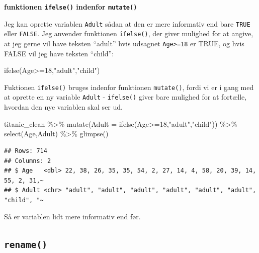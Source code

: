 \documentclass[
]{book}
\newenvironment{Shaded}{\begin{snugshade}}{\end{snugshade}}
\newcommand{\AttributeTok}[1]{\textcolor[rgb]{0.77,0.63,0.00}{#1}}
\newcommand{\DecValTok}[1]{\textcolor[rgb]{0.00,0.00,0.81}{#1}}
\newcommand{\FunctionTok}[1]{\textcolor[rgb]{0.00,0.00,0.00}{#1}}
\newcommand{\NormalTok}[1]{#1}
\newcommand{\SpecialCharTok}[1]{\textcolor[rgb]{0.00,0.00,0.00}{#1}}
\newcommand{\StringTok}[1]{\textcolor[rgb]{0.31,0.60,0.02}{#1}}
\begin{document}
\textbf{funktionen \texttt{ifelse()} indenfor \texttt{mutate()}}

Jeg kan oprette variablen \texttt{Adult} sådan at den er mere informativ end bare \texttt{TRUE} eller \texttt{FALSE}. Jeg anvender funktionen \texttt{ifelse()}, der giver mulighed for at angive, at jeg gerne vil have teksten ``adult'' hvis udsagnet \texttt{Age\textgreater{}=18} er TRUE, og hvis FALSE vil jeg have teksten ``child'':

\begin{Shaded}
\begin{Highlighting}[]
\FunctionTok{ifelse}\NormalTok{(Age}\SpecialCharTok{\textgreater{}=}\DecValTok{18}\NormalTok{,}\StringTok{"adult"}\NormalTok{,}\StringTok{"child"}\NormalTok{)}
\end{Highlighting}
\end{Shaded}

Fuktionen \texttt{ifelse()} bruges indenfor funktionen \texttt{mutate()}, fordi vi er i gang med at oprette en ny variable \texttt{Adult} - \texttt{ifelse()} giver bare mulighed for at fortælle, hvordan den nye variablen skal ser ud.

\begin{Shaded}
\begin{Highlighting}[]
\NormalTok{titanic\_clean }\SpecialCharTok{\%\textgreater{}\%} 
    \FunctionTok{mutate}\NormalTok{(}\AttributeTok{Adult =} \FunctionTok{ifelse}\NormalTok{(Age}\SpecialCharTok{\textgreater{}=}\DecValTok{18}\NormalTok{,}\StringTok{"adult"}\NormalTok{,}\StringTok{"child"}\NormalTok{)) }\SpecialCharTok{\%\textgreater{}\%}
    \FunctionTok{select}\NormalTok{(Age,Adult) }\SpecialCharTok{\%\textgreater{}\%}
    \FunctionTok{glimpse}\NormalTok{()}
\end{Highlighting}
\end{Shaded}

\begin{verbatim}
## Rows: 714
## Columns: 2
## $ Age   <dbl> 22, 38, 26, 35, 35, 54, 2, 27, 14, 4, 58, 20, 39, 14, 55, 2, 31,~
## $ Adult <chr> "adult", "adult", "adult", "adult", "adult", "adult", "child", "~
\end{verbatim}

Så er variablen lidt mere informativ end før.

\hypertarget{rename}{%
\subsection{\texorpdfstring{\texttt{rename()}}{rename()}}\label{rename}}
\end{document}
